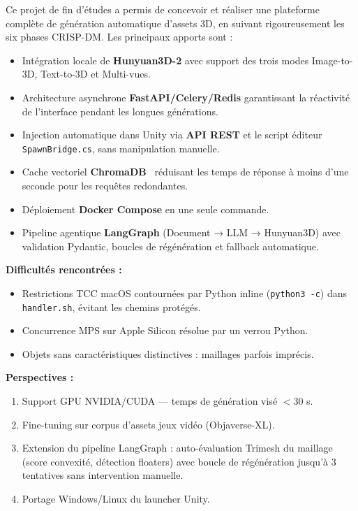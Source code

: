 \documentclass[12pt,a4paper,oneside]{report}
\begin{document}
\noindent Ce projet de fin d'études a permis de concevoir et réaliser une
plateforme complète de génération automatique d'assets 3D, en suivant
rigoureusement les six phases CRISP-DM. Les principaux apports sont :

\begin{itemize}
  \item Intégration locale de \textbf{Hunyuan3D-2} avec support des trois
    modes Image-to-3D, Text-to-3D et Multi-vues.
  \item Architecture asynchrone \textbf{FastAPI/Celery/Redis} garantissant
    la réactivité de l'interface pendant les longues générations.
  \item Injection automatique dans Unity via \textbf{API REST} et
    le script éditeur \texttt{SpawnBridge.cs}, sans manipulation manuelle.
  \item Cache vectoriel \textbf{ChromaDB}~\cite{chromadb} réduisant les temps de réponse
    à moins d'une seconde pour les requêtes redondantes.
  \item Déploiement \textbf{Docker Compose} en une seule commande.
  \item Pipeline agentique \textbf{LangGraph} (Document → LLM → Hunyuan3D)
    avec validation Pydantic, boucles de régénération et fallback automatique.
\end{itemize}

\medskip\noindent\textbf{Difficultés rencontrées :}
\begin{itemize}
  \item Restrictions TCC macOS contournées par Python inline (\texttt{python3 -c}) dans \texttt{handler.sh}, évitant les chemins protégés.
  \item Concurrence MPS sur Apple Silicon résolue par un verrou Python.
  \item Objets sans caractéristiques distinctives : maillages parfois imprécis.
\end{itemize}

\medskip\noindent\textbf{Perspectives :}
\begin{enumerate}
  \item Support GPU NVIDIA/CUDA --- temps de génération visé $<$30 s.
  \item Fine-tuning sur corpus d'assets jeux vidéo (Objaverse-XL).
  \item Extension du pipeline LangGraph : auto-évaluation Trimesh du maillage
    (score convexité, détection floaters) avec boucle de régénération
    jusqu'à 3 tentatives sans intervention manuelle.
  \item Portage Windows/Linux du launcher Unity.
\end{enumerate}
\end{document}
